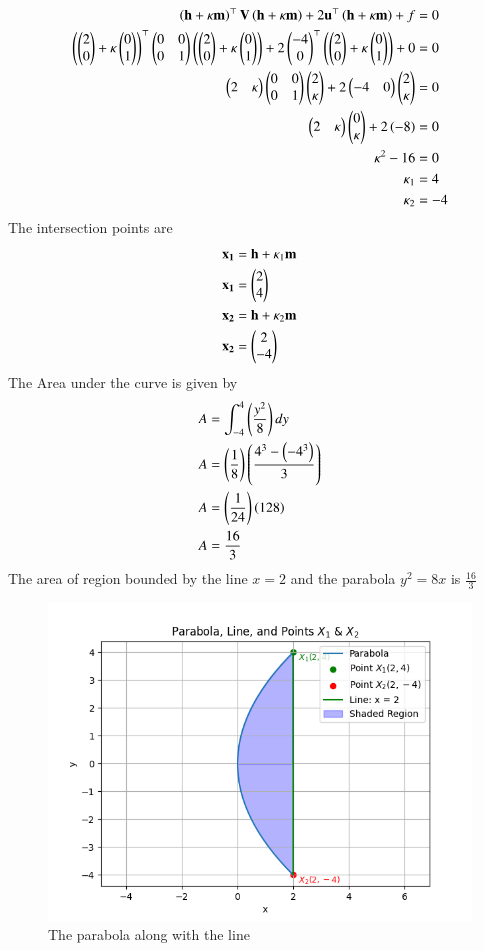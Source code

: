 \documentclass[journal]{IEEEtran}
\begin{document}
\begin{align}
\left(\mathbf{h}+\kappa\mathbf{m}\right)^\top\mathbf{V}\left(\mathbf{h}+\kappa\mathbf{m}\right) + 2\mathbf{u}^\top\left(\mathbf{h}+\kappa\mathbf{m}\right) + f &= 0\\
\left(\begin{pmatrix}2\\0\end{pmatrix}+\kappa\begin{pmatrix}0\\1\end{pmatrix}\right)^\top\begin{pmatrix}0 & 0\\0 & 1\end{pmatrix}\left(\begin{pmatrix}2\\0\end{pmatrix}+\kappa\begin{pmatrix}0\\1\end{pmatrix}\right) + 2\begin{pmatrix}-4\\0\end{pmatrix}^\top\left(\begin{pmatrix}2\\0\end{pmatrix}+\kappa\begin{pmatrix}0\\1\end{pmatrix}\right) + 0 &= 0\\
\begin{pmatrix}2&\kappa\end{pmatrix}\begin{pmatrix}0&0\\0&1\end{pmatrix}\begin{pmatrix}2\\\kappa\end{pmatrix}+2\begin{pmatrix}-4&0\end{pmatrix}\begin{pmatrix}2\\\kappa\end{pmatrix} &= 0\\
\begin{pmatrix}2&\kappa\end{pmatrix}\begin{pmatrix}0\\\kappa\end{pmatrix}+2\left(-8\right) &= 0\\
\kappa^2-16 &= 0\\
\kappa_1&=4\\
\kappa_2&=-4\\
\end{align}
The intersection points are
\begin{align}
\mathbf{x_1} &= \mathbf{h}+\kappa_1\mathbf{m}\\
\mathbf{x_1} &= \begin{pmatrix}2\\4\end{pmatrix}\\
\mathbf{x_2} &= \mathbf{h}+\kappa_2\mathbf{m}\\
\mathbf{x_2} &= \begin{pmatrix}2\\-4\end{pmatrix}
\end{align}
The Area under the curve is given by
\begin{align}
A &= \int_{-4}^{4}\left(\frac{y^2}{8}\right)dy\\
A &= \left(\frac{1}{8}\right)\left(\frac{4^3 - \left(-4^3\right)}{3}\right)\\
A &= \left(\frac{1}{24}\right)\left(128\right)\\
A &= \frac{16}{3}
\end{align}
The area of region bounded by the line $x=2$ and the parabola $y^2=8x$ is $\frac{16}{3}$
\begin{figure}[h!]
   \centering
   \includegraphics[width = 1\linewidth]{figs/fig.png}
   \caption{The parabola along with the line}
   \label{stemplot}
\end{figure}
\end{document}
